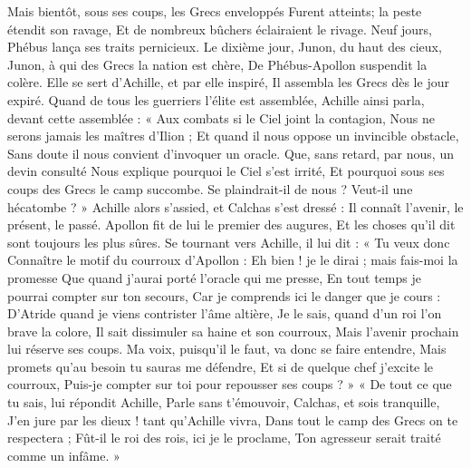 \documentclass{article}
\begin{document}
{{Mais bientôt, sous ses coups, les Grecs enveloppés
Furent atteints; la peste étendit son ravage,
Et de nombreux bûchers éclairaient le rivage.
Neuf jours, Phébus lança ses traits pernicieux.
Le dixième jour, Junon, du haut des cieux,
Junon, à qui des Grecs la nation est chère,
De Phébus-Apollon suspendit la colère.
Elle se sert d'Achille, et par elle inspiré,
Il assembla les Grecs dès le jour expiré.
Quand de tous les guerriers l'élite est assemblée,
Achille ainsi parla, devant cette assemblée :
« Aux combats si le Ciel joint la contagion,
Nous ne serons jamais les maîtres d'Ilion ;
Et quand il nous oppose un invincible obstacle,
Sans doute il nous convient d'invoquer un oracle.
Que, sans retard, par nous, un devin consulté
Nous explique pourquoi le Ciel s'est irrité,
Et pourquoi sous ses coups des Grecs le camp succombe.
Se plaindrait-il de nous ? Veut-il une hécatombe ? »
Achille alors s'assied, et Calchas s'est dressé :
Il connaît l'avenir, le présent, le passé.
Apollon fit de lui le premier des augures,
Et les choses qu'il dit sont toujours les plus sûres.
Se tournant vers Achille, il lui dit : « Tu veux donc
Connaître le motif du courroux d'Apollon :
Eh bien ! je le dirai ; mais fais-moi la promesse
Que quand j'aurai porté l'oracle qui me presse,
En tout temps je pourrai compter sur ton secours,
Car je comprends ici le danger que je cours :
D'Atride quand je viens contrister l’âme altière,
Je le sais, quand d'un roi l'on brave la colore,
Il sait dissimuler sa haine et son courroux,
Mais l'avenir prochain  lui réserve ses coups.
Ma voix, puisqu'il le faut, va donc se faire entendre,
Mais promets qu'au besoin tu sauras me défendre,
Et si de quelque chef j'excite le courroux,
Puis-je compter sur toi pour repousser ses coups ? »
« De tout ce que tu sais, lui répondit Achille,
Parle sans t'émouvoir, Calchas, et sois tranquille,
J'en jure par les dieux ! tant qu'Achille vivra,
Dans tout le camp des Grecs on te respectera ;
Fût-il le roi des rois, ici je le proclame,
Ton agresseur serait traité comme un infâme. »}}
\pend
\endnumbering
\end{document}
